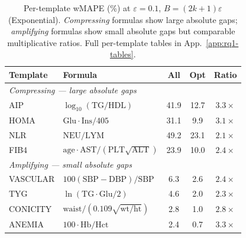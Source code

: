 \begin{table}[h]
\centering
\setlength{\tabcolsep}{4pt}
\small
\caption{Per-template wMAPE (\%) at $\varepsilon = 0.1$, $B = (2k{+}1)\varepsilon$ (Exponential). \emph{Compressing} formulas show large absolute gaps; \emph{amplifying} formulas show small absolute gaps but comparable multiplicative ratios. Full per-template tables in App.~\ref{app:rq1-tables}.}
\label{tab:per_template_summary}
\begin{tabular}{l l c c c}
\toprule
\textbf{Template} & \textbf{Formula} & \textbf{All} & \textbf{Opt} & \textbf{Ratio} \\
\midrule
\multicolumn{5}{l}{\emph{Compressing — large absolute gaps}} \\
AIP & $\log_{10}(\text{TG}/\text{HDL})$ & 41.9 & 12.7 & $3.3\times$ \\
HOMA & $\text{Glu}\cdot\text{Ins}/405$ & 31.1 & 9.9 & $3.1\times$ \\
NLR & $\text{NEU}/\text{LYM}$ & 49.2 & 23.1 & $2.1\times$ \\
FIB4 & $\text{age}\cdot\text{AST}/(\text{PLT}\sqrt{\text{ALT}})$ & 23.9 & 10.0 & $2.4\times$ \\
\midrule
\multicolumn{5}{l}{\emph{Amplifying — small absolute gaps}} \\
VASCULAR & $100(\text{SBP}{-}\text{DBP})/\text{SBP}$ & 6.3 & 2.6 & $2.4\times$ \\
TYG & $\ln(\text{TG}\cdot\text{Glu}/2)$ & 4.6 & 2.0 & $2.3\times$ \\
CONICITY & $\text{waist}/(0.109\sqrt{\text{wt}/\text{ht}})$ & 2.8 & 1.0 & $2.8\times$ \\
ANEMIA & $100\cdot\text{Hb}/\text{Hct}$ & 2.4 & 0.7 & $3.3\times$ \\
\bottomrule
\end{tabular}
\end{table}
